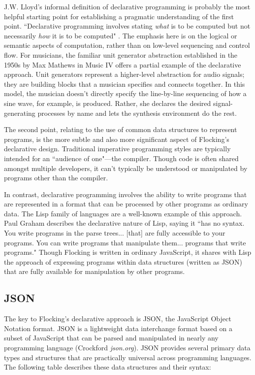 \documentclass{article}
\begin{document}
J.W. Lloyd's informal definition of declarative programming is probably the most helpful starting point for establishing a pragmatic understanding of the first point. ``Declarative programming involves stating {\it what} is to be computed but not necessarily {\it how} it is to be computed" \cite{lloyd1994practical}. The emphasis here is on the logical or semantic aspects of computation, rather than on low-level sequencing and control flow. For musicians, the familiar unit generator abstraction established in the 1950s by Max Mathews in Music IV \cite{mathews1969technology} offers a partial example of the declarative approach. Unit generators represent a higher-level abstraction for audio signals; they are building blocks that a musician specifies and connects together. In this model, the musician doesn't directly specify the line-by-line sequencing of how a sine wave, for example, is produced. Rather, she declares the desired signal-generating processes by name and lets the synthesis environment do the rest.

The second point, relating to the use of common data structures to represent programs, is the more subtle and also more significant aspect of Flocking’s declarative design. Traditional imperative programming styles are typically intended for an ``audience of one"---the compiler. Though code is often shared amongst multiple developers, it can’t typically be understood or manipulated by programs other than the compiler.

In contrast, declarative programming involves the ability to write programs that are represented in a format that can be processed by other programs as ordinary data. The Lisp family of languages are a well-known example of this approach. Paul Graham describes the declarative nature of Lisp, saying it ``has no syntax. You write programs in the parse trees... [that] are fully accessible to your programs. You can write programs that manipulate them... programs that write programs." Though Flocking is written in ordinary JavaScript, it shares with Lisp the approach of expressing programs within data structures (written as JSON) that are fully available for manipulation by other programs.

\subsection{JSON}

The key to Flocking's declarative approach is JSON, the JavaScript Object Notation format. JSON is a lightweight data interchange format based on a subset of JavaScript that can be parsed and manipulated in nearly any programming language (Crockford {\it json.org}). JSON provides several primary data types and structures that are practically universal across programming languages. The following table describes these data structures and their syntax:
\end{document}
